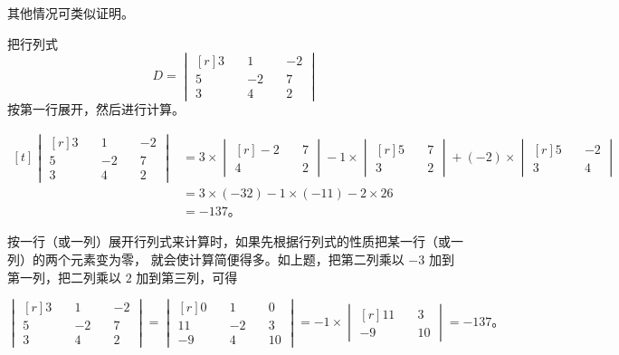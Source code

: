 其他情况可类似证明。

\liti 把行列式
$$
D =
\begin{vmatrix*}[r]
    3 \quad & 1 \quad & -2 \\
    5 \quad & -2 \quad & 7 \\
    3 \quad & 4 \quad & 2
\end{vmatrix*}
$$
按第一行展开，然后进行计算。

\jie \quad $\begin{aligned}[t]
    \begin{vmatrix*}[r]
        3 \quad & 1 \quad & -2 \\
        5 \quad & -2 \quad & 7 \\
        3 \quad & 4 \quad & 2
    \end{vmatrix*}
    &= 3 \times \begin{vmatrix*}[r]
                -2 \quad & 7 \\
                4 \quad & 2
            \end{vmatrix*}
        -1 \times   \begin{vmatrix*}[r]
                5 \quad & 7 \\
                3 \quad & 2
            \end{vmatrix*}
        + (-2) \times \begin{vmatrix*}[r]
                5 \quad & -2 \\
                3 \quad & 4
            \end{vmatrix*} \\
    &= 3 \times (-32) - 1 \times (-11) - 2 \times 26 \\
    &= -137 \text{。}
\end{aligned}$

按一行（或一列）展开行列式来计算时，如果先根据行列式的性质把某一行（或一列）的两个元素变为零，
就会使计算简便得多。如上题，把第二列乘以 $-3$ 加到第一列，把二列乘以 $2$ 加到第三列，可得

$\begin{vmatrix*}[r]
    3 \quad & 1 \quad & -2 \\
    5 \quad & -2 \quad & 7 \\
    3 \quad & 4 \quad & 2
\end{vmatrix*}
= \begin{vmatrix*}[r]
        0 \quad & 1 \quad & 0 \\
        11 \quad & -2 \quad & 3 \\
        -9 \quad & 4 \quad & 10
  \end{vmatrix*}
= -1 \times
    \begin{vmatrix*}[r]
        11 \quad & 3 \\
        -9 \quad & 10
    \end{vmatrix*}
= -137 \text{。}
$


